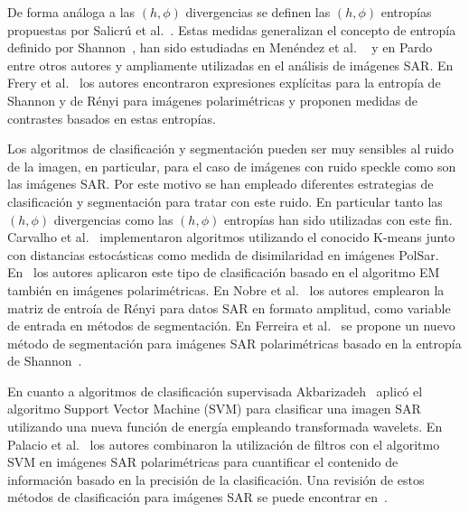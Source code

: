 \documentclass[11pt]{article}
\begin{document}
De forma análoga a las $(h,\phi)$ divergencias se definen las $(h,\phi)$ entropías propuestas por Salicrú et al.~\cite{salicruetal1993}. Estas medidas generalizan el concepto de entropía definido por Shannon~\cite{Shannon1948}, han sido estudiadas en Menéndez et al. ~\cite{Menendez1997} y en Pardo~\cite{pardo2005statistical} entre otros autores y  ampliamente utilizadas en el análisis de imágenes SAR. En Frery et al.~\cite{Frery2012} los autores encontraron expresiones explícitas para la entropía de Shannon y de Rényi para imágenes polarimétricas y proponen medidas de contrastes basados en estas entropías. 

Los algoritmos de clasificación y segmentación pueden ser muy sensibles al ruido de la imagen, en particular, para el caso de imágenes con ruido speckle como son las imágenes SAR. Por este motivo se han empleado diferentes estrategias de clasificación y segmentación para tratar con este ruido. En particular tanto las $(h,\phi)$ divergencias como las $(h,\phi)$ entropías han sido utilizadas con este fin. Carvalho et al.~\cite{Carvalho2019} implementaron algoritmos utilizando el conocido K-means junto con distancias estocásticas como medida de disimilaridad en imágenes PolSar. En~\cite{Fernandez2017} los autores aplicaron este tipo de clasificación basado en el algoritmo EM también en imágenes polarimétricas. En Nobre et al.~\cite{Nobre2016} los autores emplearon la matriz de entroía de Rényi para datos SAR en formato amplitud, como variable de entrada en métodos de segmentación. En Ferreira et al.~\cite{Ferreira2020} se propone un nuevo método de segmentación para imágenes SAR polarimétricas basado en la entropía de Shannon~\cite{Shannon1948}.   


En cuanto a algoritmos de clasificación supervisada Akbarizadeh~\cite{Akbarizadeh2012} aplicó el algoritmo Support Vector Machine (SVM) para clasificar una imagen SAR utilizando una nueva función de energía empleando transformada wavelets. En Palacio et al.~\cite{Palacio2019} los autores combinaron la utilización de filtros con el algoritmo SVM en imágenes SAR polarimétricas para cuantificar el contenido de información basado en la precisión de la clasificación.  Una revisión de estos métodos de clasificación para imágenes SAR se puede encontrar en~\cite{Parikh2020}. 
\end{document}
